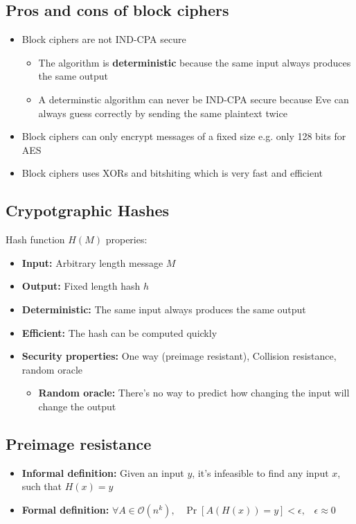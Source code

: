 \documentclass[12pt,a4paper]{article}
\begin{document}
\subsection{Pros and cons of block ciphers}
\begin{itemize}
    \item Block ciphers are not IND-CPA secure
    \begin{itemize}
        \item The algorithm is \textbf{deterministic} because the same input always produces the same output
        \item A determinstic algorithm can never be IND-CPA secure because Eve can always guess correctly by sending the same plaintext twice
    \end{itemize}
    \item Block ciphers can only encrypt messages of a fixed size e.g. only 128 bits for AES
    \item Block ciphers uses XORs and bitshiting which is very fast and efficient
\end{itemize}

\subsection{Crypotgraphic Hashes}
Hash function $H(M)$ properies:
\begin{itemize}
    \item \textbf{Input:} Arbitrary length message $M$
    \item \textbf{Output:} Fixed length hash $h$
    \item \textbf{Deterministic:} The same input always produces the same output
    \item \textbf{Efficient:} The hash can be computed quickly
    \item \textbf{Security properties:} One way (preimage resistant), Collision resistance, random oracle
    \begin{itemize}
        \item \textbf{Random oracle:} There's no way to predict how changing the input will change the output
    \end{itemize}
\end{itemize}

\subsection{Preimage resistance}
\begin{itemize}
    \item \textbf{Informal definition:} Given an input $y$, it's infeasible to find any input $x$, such that $H(x) = y$
    \item \textbf{Formal definition: } $\forall A \in \mathcal{O}(n^k), \hspace{10pt} \Pr[A(H(x)) = y] < \epsilon, \hspace{10pt} \epsilon \approx 0$
\end{itemize}
\end{document}
